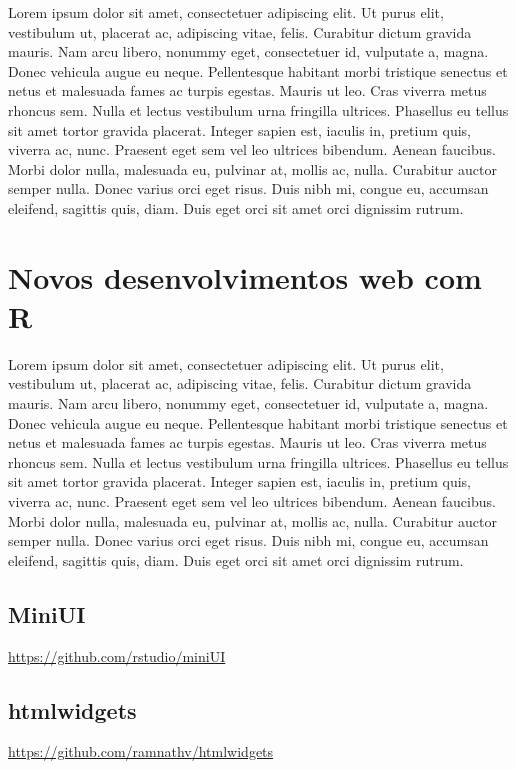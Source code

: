 \documentclass[]{book}
\begin{document}
Lorem ipsum dolor sit amet, consectetuer adipiscing elit. Ut purus elit,
vestibulum ut, placerat ac, adipiscing vitae, felis. Curabitur dictum
gravida mauris. Nam arcu libero, nonummy eget, consectetuer id,
vulputate a, magna. Donec vehicula augue eu neque. Pellentesque habitant
morbi tristique senectus et netus et malesuada fames ac turpis egestas.
Mauris ut leo. Cras viverra metus rhoncus sem. Nulla et lectus
vestibulum urna fringilla ultrices. Phasellus eu tellus sit amet tortor
gravida placerat. Integer sapien est, iaculis in, pretium quis, viverra
ac, nunc. Praesent eget sem vel leo ultrices bibendum. Aenean faucibus.
Morbi dolor nulla, malesuada eu, pulvinar at, mollis ac, nulla.
Curabitur auctor semper nulla. Donec varius orci eget risus. Duis nibh
mi, congue eu, accumsan eleifend, sagittis quis, diam. Duis eget orci
sit amet orci dignissim rutrum.

\chapter{Novos desenvolvimentos web com
R}\label{novos-desenvolvimentos-web-com-r}

Lorem ipsum dolor sit amet, consectetuer adipiscing elit. Ut purus elit,
vestibulum ut, placerat ac, adipiscing vitae, felis. Curabitur dictum
gravida mauris. Nam arcu libero, nonummy eget, consectetuer id,
vulputate a, magna. Donec vehicula augue eu neque. Pellentesque habitant
morbi tristique senectus et netus et malesuada fames ac turpis egestas.
Mauris ut leo. Cras viverra metus rhoncus sem. Nulla et lectus
vestibulum urna fringilla ultrices. Phasellus eu tellus sit amet tortor
gravida placerat. Integer sapien est, iaculis in, pretium quis, viverra
ac, nunc. Praesent eget sem vel leo ultrices bibendum. Aenean faucibus.
Morbi dolor nulla, malesuada eu, pulvinar at, mollis ac, nulla.
Curabitur auctor semper nulla. Donec varius orci eget risus. Duis nibh
mi, congue eu, accumsan eleifend, sagittis quis, diam. Duis eget orci
sit amet orci dignissim rutrum.

\section{MiniUI}\label{miniui}

\url{https://github.com/rstudio/miniUI}

\section{htmlwidgets}\label{htmlwidgets}

\url{https://github.com/ramnathv/htmlwidgets}


\end{document}
